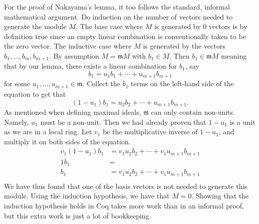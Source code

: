 \documentclass{article}
\begin{document}
For the proof of Nakayama's lemma, it too follows the standard, informal
mathematical argument. Do induction on the number of vectors needed to generate
the module \(M\). The base case where \(M\) is generated by 0 vectors is by
definition true since an empty linear combination is conventionally taken to be
the zero vector. The inductive case where \(M\) is generated by the vectors
\(b_{1}, \dots, b_{m}, b_{m+1}\). By assumption \(M = \mathfrak{m} M\) with
\(b_{1}\in M\). Then \(b_{1}\in\mathfrak{m} M\) meaning that by our lemma,
there exists a linear combination for \(b_{1}\), say
\[b_{1} = u_{1} b_{1} + \cdots + u_{m+1} b_{m+1}\]
for some \(u_{1}, \dots, u_{m+1}\in\mathfrak{m}\). Collect the \(b_{1}\) terms
on the left-hand side of the equation to get that
\[(1 - u_{1}) b_{1} = u_{2} b_{2} + \cdots + u_{m+1} b_{m+1}\text{.}\]
As mentioned when defining maximal ideals, \(\mathfrak{m}\) can only contain
non-units. Namely, \(u_{1}\) must be a non-unit. Then we had already proven
that \(1 - u_{1}\) is a unit as we are in a local ring. Let \(v_{1}\) be the
multiplicative inverse of \(1 - u_{1}\), and multiply it on both sides of the
equation.
\begin{align*}
  v_{1} (1 - u_{1}) b_{1}
    & = v_{1} u_{2} b_{2} + \cdots + v_{1} u_{m+1} b_{m+1} \\
  1 b_{1} & = \\
  b_{1} & = v_{1} u_{2} b_{2} + \cdots + v_{1} u_{m+1} b_{m+1} \\
\end{align*}
We have thus found that one of the basis vectors is not needed to generate this
module. Using the induction hypothesis, we have that \(M = 0\). Showing that
the induction hypothesis holds in Coq takes more work than in an informal
proof, but this extra work is just a lot of bookkeeping.



\end{document}
